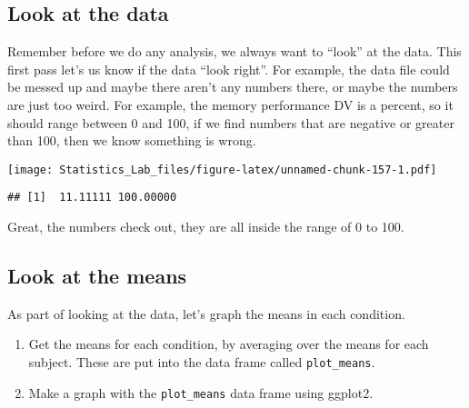\documentclass[
]{book}
\newenvironment{Shaded}{\begin{snugshade}}{\end{snugshade}}
\newcommand{\FunctionTok}[1]{\textcolor[rgb]{0.13,0.29,0.53}{\textbf{#1}}}
\newcommand{\NormalTok}[1]{#1}
\newcommand{\SpecialCharTok}[1]{\textcolor[rgb]{0.81,0.36,0.00}{\textbf{#1}}}
\begin{document}
\hypertarget{look-at-the-data-5}{%
\subsection{Look at the data}\label{look-at-the-data-5}}

Remember before we do any analysis, we always want to ``look'' at the
data. This first pass let's us know if the data ``look right''. For
example, the data file could be messed up and maybe there aren't any
numbers there, or maybe the numbers are just too weird. For example, the
memory performance DV is a percent, so it should range between 0 and
100, if we find numbers that are negative or greater than 100, then we
know something is wrong.

\begin{Shaded}
\end{Shaded}

\texttt{[image: Statistics\_Lab\_files/figure-latex/unnamed-chunk-157-1.pdf]}

\begin{Shaded}
\end{Shaded}

\begin{verbatim}
## [1]  11.11111 100.00000
\end{verbatim}

Great, the numbers check out, they are all inside the range of 0 to 100.

\hypertarget{look-at-the-means-2}{%
\subsection{Look at the means}\label{look-at-the-means-2}}

As part of looking at the data, let's graph the means in each condition.

\begin{enumerate}
\def\labelenumi{\arabic{enumi}.}
\item
  Get the means for each condition, by averaging over the means for
  each subject. These are put into the data frame called \texttt{plot\_means}.
\item
  Make a graph with the \texttt{plot\_means} data frame using ggplot2.
\end{enumerate}
\end{document}
